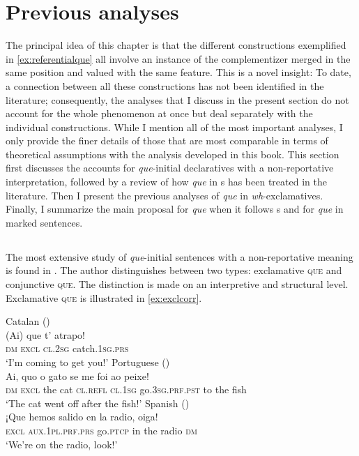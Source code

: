 \section{Previous analyses}\label{sec:presupeval} 
The principal idea of this chapter is that the different constructions exemplified in \eqref{ex:referentialque} all involve an instance of the complementizer merged in the same position and valued with the same feature. This is a novel insight: To date, a connection between all these constructions has not been identified  in the literature; consequently, the analyses that I discuss in the present section do not account for the whole phenomenon at once but  deal  separately with the individual constructions. While I mention all of the most important analyses, I only provide the finer details of those that are most comparable in terms of theoretical assumptions with the analysis developed in this book. This section first discusses the accounts for \emph{que}-initial declaratives with a non-reportative interpretation, followed by a review of how  \emph{que} in s has been treated in the literature. Then I present the previous analyses of \emph{que} in \textit{wh}-exclamatives. Finally, I summarize the main proposal  for \emph{que} when it follows s and  for \emph{que} in  marked sentences.

\subsection{\citet{Corr2016}}
The most extensive study of \emph{que}-initial sentences with a non-reportative meaning is found in \citet{Corr2016}. The author distinguishes between two types:  exclamative \textsc{que} and conjunctive \textsc{que}. The distinction is made  on an interpretive and structural level.  Exclamative \textsc{que} is illustrated in \eqref{ex:exclcorr}. 

\ea \label{ex:exclcorr}
\ea
Catalan (\citealt[88: ex 9]{Corr2016})\\
\gll (Ai) que t' atrapo! \\
\textsc{dm} \textsc{excl} \textsc{cl.2sg} catch.\textsc{1sg.prs}\\
\glt `I'm coming to get you!' 
\ex
Portuguese  (\citealt[88: ex 11]{Corr2016})\\ 
\gll Ai, quo o gato se me foi ao peixe! \\
\textsc{dm} \textsc{excl} the cat \textsc{cl.refl} \textsc{cl.1sg} go.\textsc{3sg.prf.pst} {to the} fish\\
\glt `The cat went off after the fish!'
\ex
		Spanish (\citealt[92: ex 31]{Corr2016})\\
\gll  ¡Que hemos salido en la radio, oiga! \\
\textsc{excl} \textsc{aux.1pl.prf.prs} go.\textsc{ptcp} in the radio \textsc{dm}\\
\glt `We’re on the radio, look!' 
\z
\z

